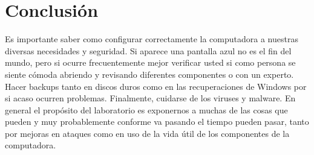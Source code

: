 \documentclass[stu, 12pt, letterpaper, donotrepeattitle, floatsintext, natbib, helv]{apa7}
\begin{document}
\section*{Conclusión}
{}
Es importante saber como configurar correctamente la computadora a nuestras diversas necesidades y seguridad. Si aparece una pantalla azul no es el fin del mundo, pero si ocurre frecuentemente mejor verificar usted si como persona se siente cómoda abriendo y revisando diferentes componentes o con un experto. Hacer backups tanto en discos duros como en las recuperaciones de Windows por si acaso ocurren problemas. Finalmente, cuidarse de los viruses y malware. En general el propósito del laboratorio es exponernos a muchas de las cosas que pueden y muy probablemente conforme va pasando el tiempo pueden pasar, tanto por mejoras en ataques como en uso de la vida útil de los componentes de la computadora.


\newpage
\renewcommand\refname{\large\textbf{Referencias}}

\end{document}
